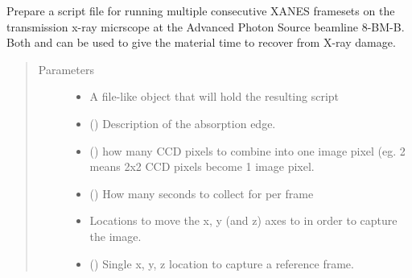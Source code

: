 \documentclass[letterpaper,10pt,english]{sphinxmanual}
\begin{document}
\begin{fulllineitems}
\label{\detokenize{xanespy:xanespy.beamlines.ssrl6_xanes_script}}
Prepare a script file for running multiple consecutive XANES
framesets on the transmission x-ray micrscope at the Advanced
Photon Source beamline 8-BM-B. Both  and
 can be used to give the material time to recover from
X-ray damage.
\begin{quote}\begin{description}
\item[{Parameters}] \leavevmode\begin{itemize}
\item {} 
 \textendash{} A file-like object that will hold the resulting script

\item {} 
 ({\hyperref[\detokenize{xanespy:xanespy.edges.Edge}]{}}) \textendash{} Description of the absorption edge.

\item {} 
 (\sphinxstyleliteralemphasis{, }) \textendash{} how many CCD pixels to combine into one image pixel (eg. 2 means
2x2 CCD pixels become 1 image pixel.

\item {} 
 (\sphinxstyleliteralemphasis{, }) \textendash{} How many seconds to collect for per frame

\item {} 
 \textendash{} Locations to move the x, y (and z) axes to in order to capture
the image.

\item {} 
 () \textendash{} Single x, y, z location to capture a reference frame.


\end{itemize}
\end{description}
\end{quote}
\end{fulllineitems}
\end{document}
